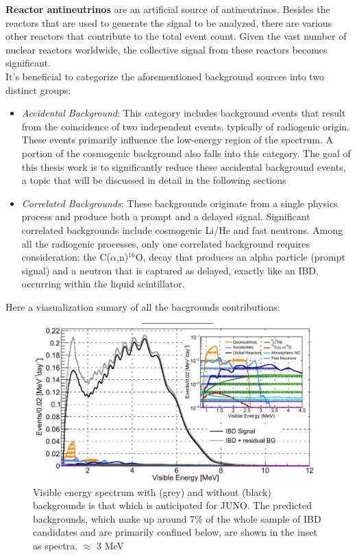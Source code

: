 \textbf{Reactor antineutrinos} are an artificial source of antineutrinos. Besides the reactors that are used to generate the signal to be analyzed, there are various other reactors that contribute to the total event count. Given the vast number of nuclear reactors worldwide, the collective signal from these reactors becomes significant.\\




It's beneficial to categorize the aforementioned background sources into two distinct groups:

\begin{itemize}
	\item \textit{Accidental Background}: This category includes background events that result from the coincidence of two independent events, typically of radiogenic origin. These events primarily influence the low-energy region of the spectrum. A portion of the cosmogenic background also falls into this category. The goal of this thesis work is to significantly reduce these accidental background events, a topic that will be discussed in detail in the following sections
	\item \textit{Correlated Backgrounds}: These backgrounds originate from a single physics process and produce both a prompt and a delayed signal. Significant correlated backgrounds include cosmogenic Li/He and fast neutrons. Among all the radiogenic processes, only one correlated background requires consideration: the $\mathrm{C}$($\alpha$,n)$^{16}\mathrm{O}$, decay that produces an alpha particle (prompt signal) and a neutron that is captured as delayed, exactly like an IBD, occurring within the liquid scintillator.
\end{itemize}
 





Here a viasualization sumary of all the bacgrounds contributions:

\begin{figure}[h]
	\centering
	\includegraphics[width=0.7\linewidth]{Images/backgrounds_spectrum}
	\caption{Visible energy spectrum with (grey) and without (black) backgrounds is that which is anticipated for JUNO. The predicted backgrounds, which make up around 7$\%$ of the whole sample of IBD candidates and are primarily confined below, are shown in the inset as spectra. $\approx$ 3 MeV}
	\label{fig:backgroundsspectrum}
\end{figure}


